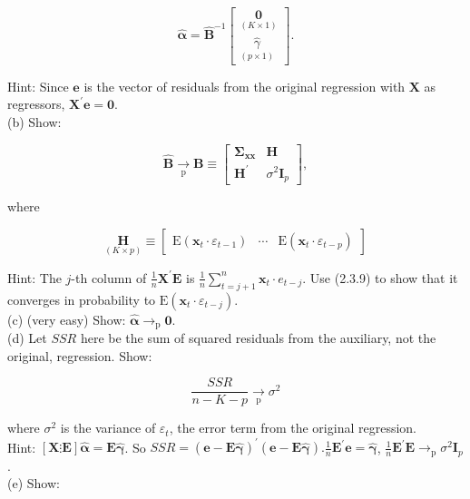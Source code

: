 \documentclass[10pt]{article}
\begin{document}
$$
\hat{\boldsymbol{\alpha}}=\widehat{\mathbf{B}}^{-1}\left[\begin{array}{c}
\underset{(K \times 1)}{\mathbf{0}} \\
\underset{(p \times 1)}{\hat{\gamma}}
\end{array}\right] .
$$

Hint: Since $\mathbf{e}$ is the vector of residuals from the original regression with $\mathbf{X}$ as regressors, $\mathbf{X}^{\prime} \mathbf{e}=\mathbf{0}$.\\
(b) Show:

$$
\widehat{\mathbf{B}} \underset{\mathrm{p}}{\rightarrow} \mathbf{B} \equiv\left[\begin{array}{cc}
\boldsymbol{\Sigma}_{\mathbf{x x}} & \mathbf{H} \\
\mathbf{H}^{\prime} & \sigma^{2} \mathbf{I}_{p}
\end{array}\right],
$$

where

$$
\underset{(K \times p)}{\mathbf{H}} \equiv\left[\begin{array}{lll}
\mathrm{E}\left(\mathbf{x}_{t} \cdot \varepsilon_{t-1}\right) & \cdots & \mathrm{E}\left(\mathbf{x}_{t} \cdot \varepsilon_{t-p}\right)
\end{array}\right]
$$

Hint: The $j$-th column of $\frac{1}{n} \mathbf{X}^{\prime} \mathbf{E}$ is $\frac{1}{n} \sum_{t=j+1}^{n} \mathbf{x}_{t} \cdot e_{t-j}$. Use (2.3.9) to show that it converges in probability to $\mathrm{E}\left(\mathbf{x}_{t} \cdot \varepsilon_{t-j}\right)$.\\
(c) (very easy) Show: $\hat{\boldsymbol{\alpha}} \rightarrow_{\mathrm{p}} \mathbf{0}$.\\
(d) Let $S S R$ here be the sum of squared residuals from the auxiliary, not the original, regression. Show:

$$
\frac{S S R}{n-K-p} \underset{\mathrm{p}}{\rightarrow} \sigma^{2}
$$

where $\sigma^{2}$ is the variance of $\varepsilon_{t}$, the error term from the original regression.\\
Hint: $[\mathbf{X} \vdots \mathbf{E}] \hat{\boldsymbol{\alpha}}=\mathbf{E} \hat{\boldsymbol{\gamma}}$. So $S S R=(\mathbf{e}-\mathbf{E} \hat{\boldsymbol{\gamma}})^{\prime}(\mathbf{e}-\mathbf{E} \hat{\boldsymbol{\gamma}}) . \frac{1}{n} \mathbf{E}^{\prime} \mathbf{e}=\hat{\boldsymbol{\gamma}}$, $\frac{1}{n} \mathbf{E}^{\prime} \mathbf{E} \rightarrow_{\mathrm{p}} \sigma^{2} \mathbf{I}_{p}$.\\
(e) Show:
\end{document}
